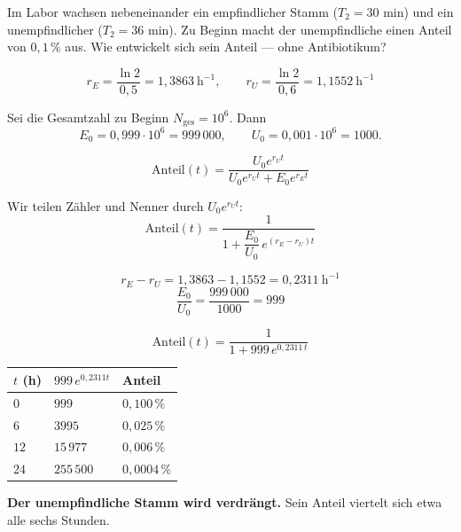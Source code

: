\begin{aufgabe}
Im Labor wachsen nebeneinander ein empfindlicher Stamm ($T_2 = 30$ min) und ein unempfindlicher ($T_2 = 36$ min). Zu Beginn macht der unempfindliche einen Anteil von $0{,}1\,\%$ aus. Wie entwickelt sich sein Anteil --- ohne Antibiotikum?

\loesung
{}
\[ r_E = \frac{\ln 2}{0{,}5} = 1{,}3863\ \mathrm{h}^{-1}, \qquad r_U = \frac{\ln 2}{0{,}6} = 1{,}1552\ \mathrm{h}^{-1} \]

Sei die Gesamtzahl zu Beginn $N_{\text{ges}} = 10^6$. Dann
\[ E_0 = 0{,}999 \cdot 10^6 = 999\,000, \qquad U_0 = 0{,}001 \cdot 10^6 = 1000 . \]

\[ \text{Anteil}(t) = \frac{U_0e^{r_Ut}}{U_0e^{r_Ut} + E_0e^{r_Et}} \]

Wir teilen Zähler und Nenner durch $U_0e^{r_Ut}$:
\[ \text{Anteil}(t) = \frac{1}{1 + \dfrac{E_0}{U_0}\,e^{(r_E-r_U)t}} \]

\[ r_E - r_U = 1{,}3863 - 1{,}1552 = 0{,}2311\ \mathrm{h}^{-1} \]
\[ \frac{E_0}{U_0} = \frac{999\,000}{1000} = 999 \]

\[ \text{Anteil}(t) = \frac{1}{1 + 999\,e^{0{,}2311\,t}} \]

\begin{center}
\renewcommand{\arraystretch}{1.45}
\begin{tabular}{@{}P{1.8cm}P{2.6cm}P{2.6cm}@{}}
\toprule
$t$ (h) & $999\,e^{0{,}2311t}$ & \textbf{Anteil}\\
\midrule
$0$ & $999$ & $0{,}100\,\%$\\
$6$ & $3995$ & $0{,}025\,\%$\\
$12$ & $15\,977$ & $0{,}006\,\%$\\
$24$ & $255\,500$ & $0{,}0004\,\%$\\
\bottomrule
\end{tabular}
\end{center}

\begin{center}
\begin{minipage}{0.9\textwidth}
\textbf{Der unempfindliche Stamm wird verdrängt.} Sein Anteil viertelt sich etwa alle sechs Stunden.
\end{minipage}
\end{center}


\end{aufgabe}
